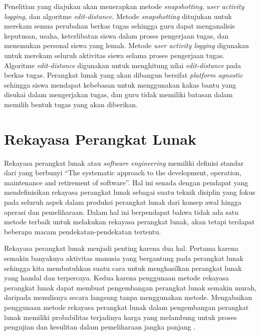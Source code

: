 Penelitian yang diajukan akan menerapkan metode \emph{snapshotting}, \emph{user
  activity logging}, dan algoritme \emph{edit-distance}. Metode
\emph{snapshotting} ditujukan untuk merekam semua perubahan berkas tugas
sehingga guru dapat menganalisis keputusan, usaha, keterlibatan siswa dalam
proses pengerjaan tugas, dan menemukan personal siswa yang lemah. Metode
\emph{user activity logging} digunakan untuk merekam seluruh aktivitas siswa
selama proses pengerjaan tugas. Algoritme \emph{edit-distance} digunakan untuk
menghitung nilai \emph{edit-distance} pada berkas tugas. Perangkat lunak yang
akan dibangun bersifat \emph{platform agnostic} sehingga siswa mendapat
kebebasan untuk menggunakan kakas bantu yang disukai dalam mengerjakan tugas,
dan guru tidak memiliki batasan dalam memilih bentuk tugas yang akan diberikan.

\section{Rekayasa Perangkat Lunak}

Rekayasa perangkat lunak atau \emph{software engineering} memiliki
definisi standar dari \textcite{ieee1990} yang berbunyi ``The
systematic approach to the development, operation, maintenance and
retirement of software''. Hal ini senada dengan pendapat
\textcite{sommerville2016software} yang mendefinisikan rekayasa perangkat
lunak sebagai suatu teknik disiplin yang fokus pada seluruh aspek
dalam produksi perangkat lunak dari konsep awal hingga operasi dan
pemeliharaan. Dalam hal ini \textcite{bell2000software} berpendapat
bahwa tidak ada satu metode terbaik untuk melakukan rekayasa perangkat
lunak, akan tetapi terdapat beberapa macam pendekatan-pendekatan
tertentu.

Rekayasa perangkat lunak menjadi penting karena dua hal. Pertama
karena semakin banyaknya aktivitas manusia yang bergantung pada
perangkat lunak sehingga kita membutuhkan suatu cara untuk
menghasilkan perangkat lunak yang handal dan terpercaya. Kedua karena
penggunaan metode rekayasa perangkat lunak dapat membuat pengembangan
perangkat lunak semakin murah, daripada menulisnya secara langsung
tanpa menggunakan metode. Mengabaikan penggunaan metode rekayasa
perangkat lunak dalam pengembangan perangkat lunak memiliki
probabilitas terjadinya harga yang melambung untuk proses pengujian
dan kesulitan dalam pemeliharaan jangka panjang
\parencite{sommerville2016software}.

